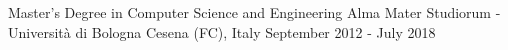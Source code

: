 

\begin{cventries}

  \cventry
    {Master's Degree in Computer Science and Engineering} %
    {Alma Mater Studiorum - Università di Bologna} %
    {Cesena (FC), Italy} %
    {September 2012 - July 2018} %
    {}


%




\end{cventries}
